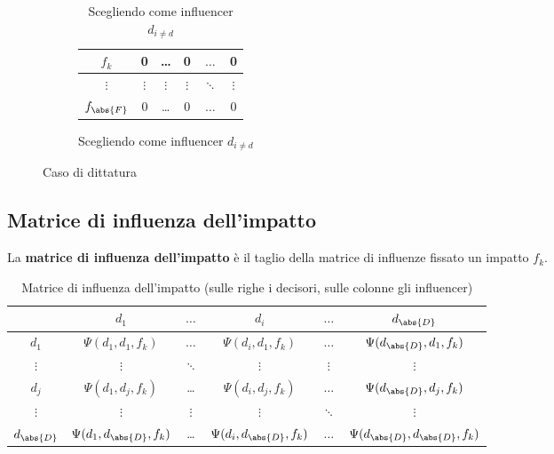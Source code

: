 \documentclass[\main/main.tex]{subfiles}
\begin{document}
\begin{figure}
\begin{subfigure}{0.48\textwidth}
\begin{table}
\begin{tabular}{|c|c|c|c|c|c|}
				\hline
				$f_k$         & 0        & \ldots   & 0        & $\ldots$ & 0             \\
				\hline
				$\vdots$      & $\vdots$ & $\vdots$ & $\vdots$ & $\ddots$ & $\vdots$      \\
				\hline
				$f_{\abs{F}}$ & 0        & \ldots   & 0        & $\ldots$ & 0             \\
				\hline
			\end{tabular}
			\caption{Scegliendo come influencer $d_{i \neq d}$}
		\end{table}
	\end{subfigure}
	\caption{Caso di dittatura}
\end{figure}


\subsection{Matrice di influenza dell'impatto}
La \textbf{matrice di influenza dell'impatto} è il taglio della matrice di influenze fissato un impatto $f_k$.

\begin{table}
	\begin{tabular}{|c|c|c|c|c|c|}
		\hline
		              & $d_1$                         & $\ldots$ & $d_i$                         & $\ldots$ & $d_{\abs{D}}$                         \\
		\hline
		$d_1$         & $\Psi(d_1, d_1, f_k)$         & $\ldots$ & $\Psi(d_i, d_1, f_k)$         & $\ldots$ & $\Psi(d_{\abs{D}}, d_1, f_k)$         \\
		\hline
		$\vdots$      & $\vdots$                      & $\ddots$ & $\vdots$                      & $\vdots$ & $\vdots$                              \\
		\hline
		$d_j$         & $\Psi(d_1, d_j, f_k)$         & \ldots   & $\Psi(d_i, d_j, f_k)$         & $\ldots$ & $\Psi(d_{\abs{D}}, d_j, f_k)$         \\
		\hline
		$\vdots$      & $\vdots$                      & $\vdots$ & $\vdots$                      & $\ddots$ & $\vdots$                              \\
		\hline
		$d_{\abs{D}}$ & $\Psi(d_1, d_{\abs{D}}, f_k)$ & \ldots   & $\Psi(d_i, d_{\abs{D}}, f_k)$ & $\ldots$ & $\Psi(d_{\abs{D}}, d_{\abs{D}}, f_k)$ \\
		\hline
	\end{tabular}
	\caption{Matrice di influenza dell'impatto (sulle righe i decisori, sulle colonne gli influencer)}
\end{table}
\end{document}
